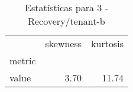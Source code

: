 \begin{table}[htbp]
\caption{Estatísticas para 3 - Recovery/tenant-b}
\label{tab:3_-_recovery_tenant-b_skewkurt}
\begin{tabular}{lrr}
\toprule
 & skewness & kurtosis \\
metric &  &  \\
\midrule
value & 3.70 & 11.74 \\
\bottomrule
\end{tabular}
\end{table}

